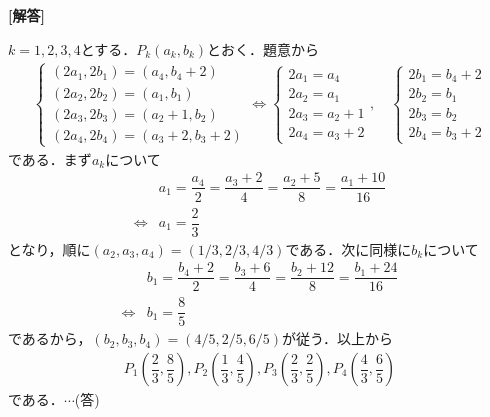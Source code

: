 \documentclass[../../main.tex]{subfiles}
\begin{document}
\begin{oframed}
  
\end{oframed}

{\bf [解答]}

$k=1,2,3,4$とする．$P_k(a_k,b_k)$とおく．題意から
\begin{align}
  \begin{cases}
    (2a_1,2b_1)=(a_4,b_4+2)  \\
    (2a_2,2b_2)=(a_1,b_1) \\
    (2a_3,2b_3)=(a_2+1,b_2)  \\
    (2a_4,2b_4)=(a_3+2,b_3+2)
  \end{cases}
  \Longleftrightarrow
  \begin{cases}
    2a_1=a_4  \\
    2a_2=a_1 \\
    2a_3=a_2+1  \\
    2a_4=a_3+2
  \end{cases}, \quad
  \begin{cases}
    2b_1=b_4+2  \\
    2b_2=b_1 \\
    2b_3=b_2  \\
    2b_4=b_3+2
  \end{cases}
\end{align}
である．まず$a_k$について
\begin{align}
  &a_1=\dfrac{a_4}{2}=\dfrac{a_3+2}{4}=\dfrac{a_2+5}{8}=\dfrac{a_1+10}{16} \\
  \Longleftrightarrow
  &a_1=\dfrac{2}{3}
\end{align}
となり，順に$(a_2,a_3,a_4)=(1/3,2/3,4/3)$である．次に同様に$b_k$について
\begin{align}
  &b_1=\dfrac{b_4+2}{2}=\dfrac{b_3+6}{4}=\dfrac{b_2+12}{8}=\dfrac{b_1+24}{16}\\
  \Longleftrightarrow
  &b_1=\dfrac{8}{5}
\end{align}
であるから，$(b_2,b_3,b_4)=(4/5,2/5,6/5)$が従う．以上から
\begin{align}
  P_1\left(\dfrac{2}{3},\dfrac{8}{5}\right) , P_2\left(\dfrac{1}{3},\dfrac{4}{5}\right) ,
  P_3\left(\dfrac{2}{3},\dfrac{2}{5}\right) , P_4\left(\dfrac{4}{3},\dfrac{6}{5}\right)
\end{align}
である．$\cdots$(答)
\end{document}
